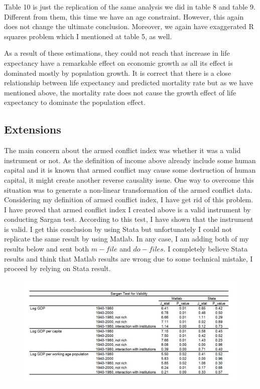 \documentclass[11pt]{article}
\begin{document}
Table 10 is just the replication of the same analysis we did in table 8 and table 9. Different from them, this time we have an age constraint. However, this again does not change the ultimate conclusion. Moreover, we again have exaggerated R squares problem which I mentioned at table 5, as well.

As a result of these estimations, they could not reach that increase in life expectancy have a remarkable effect on economic growth as all its effect is dominated mostly by population growth.  It is correct that there is a close relationship between life expectancy and predicted mortality rate but as we have mentioned above, the mortality rate does not cause the growth effect of life expectancy to dominate the population effect. 

\subsection*{Extensions}
The main concern about the armed conflict index was whether it was a valid instrument or not. As the definition of income above already include some human capital and it is known that armed conflict may cause some destruction of human capital, it might create another reverse causality issue. One way to overcome this situation was to generate a non-linear transformation of the armed conflict data. Considering my definition of armed conflict index, I have get rid of this problem. I have proved that armed conflict index I created above is a valid instrument by conducting Sargan test. According to this test, I have shown that the instrument is valid. I get this conclusion by using Stata but unfortunately I could not replicate the same result by using Matlab. In any case, I am adding both of my results below and sent both $m-file$ and $do-files$. I completely believe Stata results and think that Matlab results are wrong due to some technical mistake, I proceed by relying on Stata result.
 \begin{figure} [H]
\centering
\includegraphics[width=\textwidth]{sargan}
\label{sargan}
\end{figure}
\end{document}

